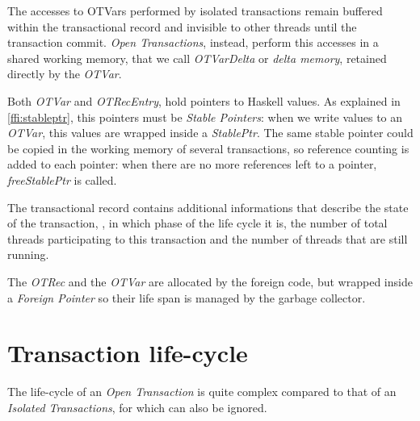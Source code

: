 The accesses to OTVars performed by isolated transactions remain buffered within the transactional record and invisible to other threads until the transaction commit. \emph{Open Transactions}, instead, perform this accesses in a shared working memory, that we call \emph{OTVarDelta} or \emph{delta memory}, retained directly by the \emph{OTVar}.

Both \emph{OTVar} and \emph{OTRecEntry}, hold pointers to Haskell values. 
As explained in \cref{ffi:stableptr}, this pointers must be \emph{Stable Pointers}: when we write values to an \emph{OTVar}, this values are wrapped inside a \emph{StablePtr}.
The same stable pointer could be copied in the working memory of several transactions, so reference counting is added to each pointer: when there are no more references left to a pointer, \emph{freeStablePtr} is called.

The transactional record contains additional informations that describe the state of the transaction, \ie, in which phase of the life cycle it is, the number of total threads participating to this transaction and the number of threads that are still running.

The \emph{OTRec} and the \emph{OTVar} are allocated by the foreign code, but wrapped inside a \emph{Foreign Pointer} so their life span is managed by the garbage collector.

\section{Transaction life-cycle}

The life-cycle of an \emph{Open Transaction} is quite complex compared to that of an \emph{Isolated Transactions}, for which can also be ignored.


